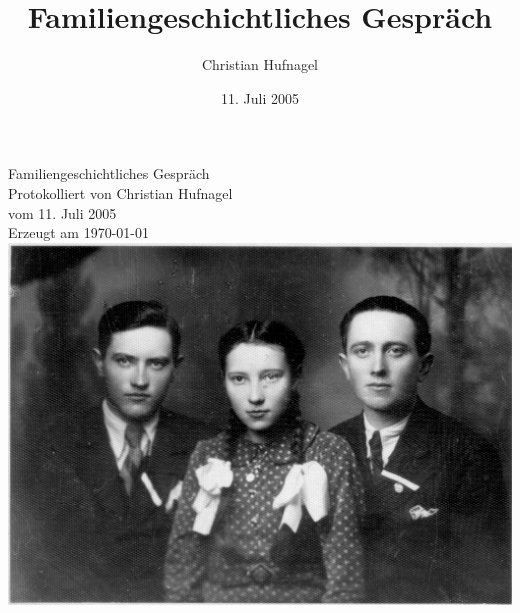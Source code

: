 \documentclass[ngerman,]{article}
\title{Familiengeschichtliches Gespräch}
\author{Christian Hufnagel}
\date{11. Juli 2005}
\begin{document}
	
					\begin{titlepage}
			\begin{centering}

												{\Huge Familiengeschichtliches Gespräch \\}
					\vspace{2cm}
					{\Large Protokolliert von Christian Hufnagel\\}
					\vspace{1cm}
					{\Large vom 11. Juli 2005\\}
					\vspace{1cm}
					{\normalsize Erzeugt am \today\\}
					\vspace{3cm}
					\includegraphics{../bilder/HeinzHansKaethe-b.jpg}
					\vfill
							
			\end{centering}
			\end{titlepage}

		
		

		{
				\setcounter{tocdepth}{3}
		\tableofcontents
					}
	
\end{document}
